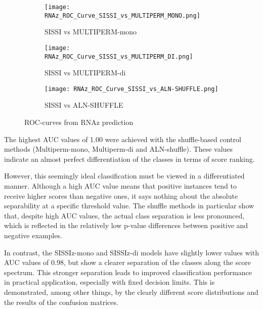 \documentclass{article}
\begin{document}
\begin{large}
\begin{large}
\begin{large}
\begin{figure}[H]
    \begin{subfigure}[b]{0.48\textwidth}
        \texttt{[image: RNAz\_ROC\_Curve\_SISSI\_vs\_MULTIPERM\_MONO.png]}
        \caption{SISSI vs MULTIPERM-mono}
        \label{fig:roc_multiperm_mono}
    \end{subfigure}
    \hfill
    \begin{subfigure}[b]{0.48\textwidth}
        \texttt{[image: RNAz\_ROC\_Curve\_SISSI\_vs\_MULTIPERM\_DI.png]}
        \caption{SISSI vs MULTIPERM-di}
        \label{fig:roc_multiperm_di}
    \end{subfigure}
    \vspace{1em}

    \begin{subfigure}[b]{0.48\textwidth}
        \texttt{[image: RNAz\_ROC\_Curve\_SISSI\_vs\_ALN-SHUFFLE.png]}
        \caption{SISSI vs ALN-SHUFFLE}
        \label{fig:roc_aln_shuffle}
    \end{subfigure}

    \caption{ROC-curves from RNAz prediction}
    \label{fig:all_roc_curves}
\end{figure}

The highest AUC values of 1.00 were achieved with the shuffle-based control methods (Multiperm-mono, Multiperm-di and ALN-shuffle). These values indicate an almost perfect differentiation of the classes in terms of score ranking.\vspace{1em}

However, this seemingly ideal classification must be viewed in a differentiated manner. Although a high AUC value means that positive instances tend to receive higher scores than negative ones, it says nothing about the absolute separability at a specific threshold value. The shuffle methods in particular show that, despite high AUC values, the actual class separation is less pronounced, which is reflected in the relatively low p-value differences between positive and negative examples.\vspace{1em}

In contrast, the SISSIz-mono and SISSIz-di models have slightly lower values with AUC values of 0.98, but show a clearer separation of the classes along the score spectrum. This stronger separation leads to improved classification performance in practical application, especially with fixed decision limits. This is demonstrated, among other things, by the clearly different score distributions and the results of the confusion matrices.\vspace{1em}


\end{large}
\end{large}
\end{large}
\end{document}
